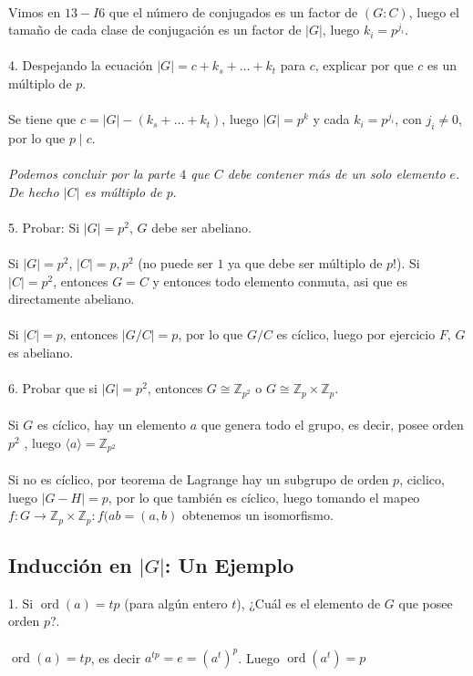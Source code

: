 \documentclass{article}
\newcommand{\Z}{\mathbb{Z}}
\begin{document}
\\
Vimos en $13-I6$ que el número de conjugados es un factor de $(G:C)$, luego el tamaño de cada clase de conjugación es un factor de $|G|$, luego $k_i=p^{j_i}$.
\\
\\
4. Despejando la ecuación $|G|=c+k_{s}+\dots+k_{t}$ para $c$, explicar por que $c$ es un múltiplo de $p$.
\\
\\
Se tiene que $c=|G|-(k_{s}+\dots+k_{t})$, luego $|G|=p^{k}$ y cada $k_i=p^{j_i}$, con $j_i \neq 0$, por lo que $p \mid c$.
\\
\\
\textit{Podemos concluir por la parte $4$ que $C$ debe contener más de un solo elemento $e$. De hecho $|C|$ es múltiplo de $p$}.
\\
\\
5. Probar: Si $|G|=p^{2}$, $G$ debe ser abeliano.
\\
\\
Si $|G|=p^{2}$, $|C|=p,p^{2}$ (no puede ser $1$ ya que debe ser múltiplo de $p$!). Si $|C|=p^{2}$, entonces $G=C$ y entonces todo elemento conmuta, asi que es directamente abeliano.
\\
\\
Si $|C|=p$, entonces $|G/C|=p$, por lo que $G/C$ es cíclico, luego por ejercicio $F$, $G$ es abeliano.
\\
\\
6. Probar que si $|G|=p^{2}$, entonces $G \cong \Z_{p^{2}}$ o $G \cong \Z_p \times \Z_p$.
\\
\\
Si $G$ es cíclico, hay un elemento $a$ que genera todo el grupo, es decir, posee orden $p^{2}$ , luego $\langle a \rangle=\Z_{p^{2}}$
\\
\\
Si no es cíclico, por teorema de Lagrange hay un subgrupo de orden $p$, ciclico, luego $|G-H|=p$, por lo que también es cíclico, luego tomando el mapeo $f:G \to \Z_p \times \Z_p: f(ab=(a,b)$ obtenemos un isomorfismo.
\\
\subsection*{Inducción en $|G|$: Un Ejemplo}
1. Si $\operatorname{ord}(a)=tp$ (para algún entero $t$), ¿Cuál es el elemento de $G$ que posee orden $p$?.
\\
\\
$\operatorname{ord}(a)=tp$, es decir $a^{tp}=e=(a^t)^p$. Luego $\operatorname{ord}(a^t)=p$
\end{document}
